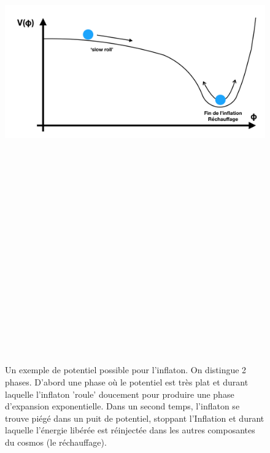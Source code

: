 \begin{figure}[htbp]
	\centering
		\includegraphics[height=25cm]{figs/slowroll.png}
	\caption[Un exemple de potentiel possible pour l'inflaton. ]{Un exemple de potentiel possible pour l'inflaton. On distingue 2 phases. D'abord une phase où le potentiel est très plat et durant laquelle l'inflaton 'roule' doucement pour produire une phase d'expansion exponentielle. Dans un second temps, l'inflaton se trouve piégé dans un puit de potentiel, stoppant l'Inflation et durant laquelle l'énergie libérée est réinjectée dans les autres composantes du cosmos (le réchauffage).}
	\label{f:slowroll}
\end{figure}


